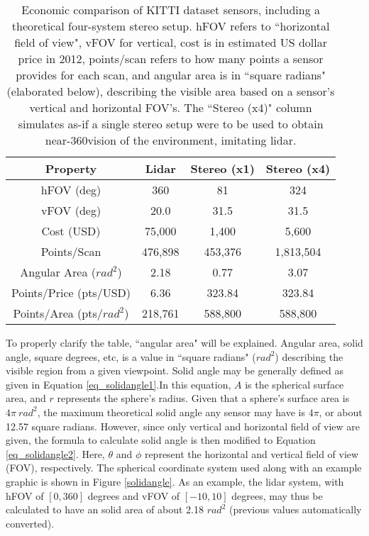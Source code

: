 \def \b #1{\textbf{#1}} %
\begin{table}[ht]
	\centering
	\caption{Economic comparison of KITTI dataset sensors, including a theoretical four-system stereo setup. hFOV refers to ``horizontal field of view", vFOV for vertical, cost is in estimated US dollar price in 2012, points/scan refers to how many points a sensor provides for each scan, and angular area is in ``square radians" (elaborated below), describing the visible area based on a sensor's vertical and horizontal FOV's. The ``Stereo (x4)" column simulates as-if a single stereo setup were to be used to obtain near-360\deg vision of the environment, imitating lidar.}
	\begin{tabular}{|c|c|c|c|}
	\hline
	\b{Property}              & \b{Lidar} & \b{Stereo (x1)} & \b{Stereo (x4)} \\ \hline
	hFOV (deg)                & 360       & 81              & 324       \\\hline
	vFOV (deg)                & 20.0      & 31.5            & 31.5      \\\hline
	Cost (USD)                & 75,000    & 1,400           & 5,600     \\\hline
	Points/Scan               & 476,898   & 453,376         & 1,813,504 \\\hline
	Angular Area ($rad^2$)    & 2.18      & 0.77            & 3.07      \\\hline
	Points/Price (pts/USD)    & 6.36      & 323.84          & 323.84    \\\hline
	Points/Area (pts/$rad^2$) & 218,761   & 588,800         & 588,800   \\\hline
	\end{tabular}
	\label{economics_table}
\end{table}


To properly clarify the table, ``angular area" will be explained. Angular area, solid angle, square degrees, etc, is a value in ``square radians" ($rad^2$) describing the visible region from a given viewpoint. Solid angle may be generally defined as given in Equation \ref{eq_solidangle1}.In this equation, $A$ is the spherical surface area, and $r$ represents the sphere's radius. Given that a sphere's surface area is $4\pi \ rad^2$, the maximum theoretical solid angle any sensor may have is $4\pi$, or about 12.57 square radians. However, since only vertical and horizontal field of view are given, the formula to calculate solid angle is then modified to Equation \ref{eq_solidangle2}. Here, $\theta$ and $\phi$ represent the horizontal and vertical field of view (FOV), respectively. The spherical coordinate system used along with an example graphic is shown in Figure \ref{solidangle}. As an example, the lidar system, with hFOV of $[0,360]$ degrees and vFOV of $[-10,10]$ degrees, may thus be calculated to have an solid area of about 2.18 ${rad}^2$ (previous values automatically converted).

